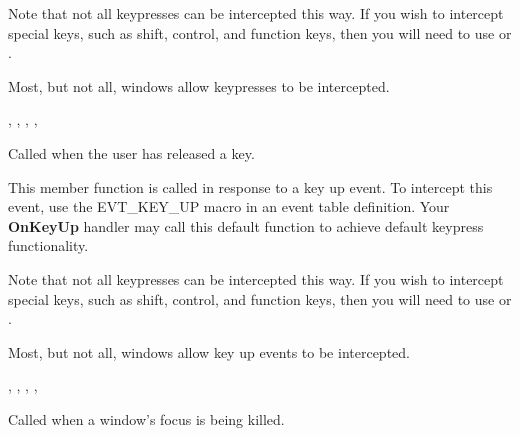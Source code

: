 Note that not all keypresses can be intercepted this way. If you wish to intercept special
keys, such as shift, control, and function keys, then you will need to use  or
.

Most, but not all, windows allow keypresses to be intercepted.


, ,\rtfsp
{}, ,\rtfsp
{}

\label{wxwindowonkeyup}


Called when the user has released a key.




This member function is called in response to a key up event. To intercept this event,
use the EVT\_KEY\_UP macro in an event table definition. Your {\bf OnKeyUp} handler may call this
default function to achieve default keypress functionality.

Note that not all keypresses can be intercepted this way. If you wish to intercept special
keys, such as shift, control, and function keys, then you will need to use  or
.

Most, but not all, windows allow key up events to be intercepted.


, ,\rtfsp
{}, ,\rtfsp
{}

\label{wxwindowonkillfocus}


Called when a window's focus is being killed.

